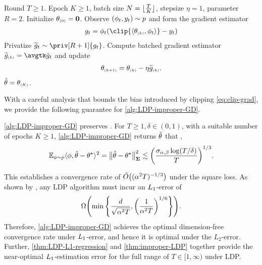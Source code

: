 \begin{algorithm}
\caption{$\AlgLDPIGD$}\label{alg:LDP-improper-GD}
\begin{algorithmic}[1]
\REQUIRE Round $T\geq 1$.
\REQUIRE Epoch $K\geq 1$, batch size $N=\lfloor\frac{T}{K}\rfloor$, stepsize $\eta=1$, parameter $R=2$.
\STATE Initialize $\theta_{\scriptscriptstyle{ (0) }}=\mathbf{0}$.
        \STATE Observe $(\phi_t,y_t)\sim p$ and form the gradient estimator
        \begin{align}\label{eq:clip-grad}
            g_t=\xt\paren{ \clip{\lr \theta\kk,\xt \rr}-\yt }
        \end{align}
        \STATE Privatize $\til g_t\sim \priv[R+1]{g_t}$.    
    \ENDFOR
    \STATE Compute batched gradient estimator $\til g\kk=\avgtk \tgt$ and update
\begin{align*}
    \theta_{\scriptscriptstyle{ (k+1) }}=\theta _{\scriptscriptstyle{ (k) }}-\eta \widetilde g_{\scriptscriptstyle{ (k) }}.
\end{align*}
\ENDFOR
\ENSURE $\hat{\theta}=\theta_{\scriptscriptstyle{ (K) }}$.
\end{algorithmic}
\end{algorithm}

With a careful analysis that bounds the bias introduced by clipping \cref{eq:clip-grad}, we provide the following guarantee for \cref{alg:LDP-improper-GD}.

\begin{theorem}\label{thm:improper-LDP}
\cref{alg:LDP-improper-GD} preserves \aLDP. For $T\geq 1, \delta\in(0,1)$, with a suitable number of epochs $K\geq 1$, \cref{alg:LDP-improper-GD} returns $\hat{\theta}$ that \whp,
\begin{align*}
    \mathbb{E}_{\phi\sim p} \langle \phi, \hat{\theta}-\theta^\star \rangle^2=\big\|\hat{\theta}-\theta^\star\big\|_{\boldsymbol{\Sigma}}^2\lesssim {\left( \frac{\sigma_{\alpha,\beta}\log(T/\delta)}{T} \right)}^{1/3}.
\end{align*}
\end{theorem}

This establishes a convergence rate of $\tilde{O}{\left( (\alpha^2T)^{-1/3} \right)}$ under the square loss. As shown by \citet[Corollary I.8]{chen2024private}, any LDP algorithm must incur an $L_1$-error of
\begin{align*}
    \Omega{\left( \min\left\{\frac{d}{\sqrt{\alpha^2 T}},{\left( \frac{1}{\alpha^2 T} \right)}^{1/6}\right\} \right)}.
\end{align*}
Therefore, \cref{alg:LDP-improper-GD} achieves the optimal dimension-free convergence rate under $L_1$-error, and hence it is optimal under the $L_2$-error. Further, \cref{thm:LDP-L1-regression} and \cref{thm:improper-LDP} together provide the near-optimal $L_1$-estimation error for the full range of $T\in[1,\infty)$ under LDP.

